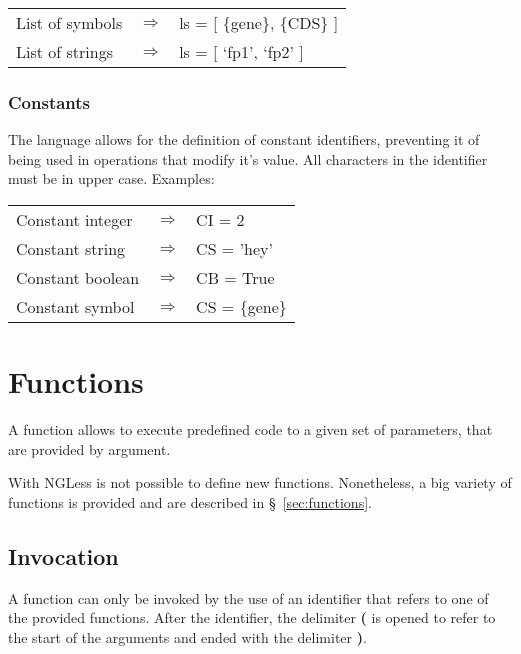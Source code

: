 \documentclass{article}
\begin{document}
\begin{table}[H]
\center
    \begin{tabular}{lll}
    List of symbols & $\Longrightarrow$ & ls = [ \{gene\}, \{CDS\} ] \\
    List of strings & $\Longrightarrow$ & ls = [ `fp1', `fp2' ] \\
    \end{tabular}
\end{table}


\subsubsection{Constants}

The language allows for the definition of constant identifiers, preventing it of being used in operations that modify it's value. All characters in the identifier must be in upper case. Examples:


\begin{table}[H]
\center
    \begin{tabular}{lll}
    Constant integer & $\Longrightarrow$ & CI = 2 \\
    Constant string  & $\Longrightarrow$ & CS = 'hey' \\
    Constant boolean & $\Longrightarrow$ & CB = True \\
    Constant symbol  & $\Longrightarrow$ & CS = \{gene\} \\
    \end{tabular}
\end{table}


\section{Functions}

A function allows to execute predefined code to a given set of parameters, that are provided by argument.

With NGLess is not possible to define new functions. Nonetheless, a big variety of functions is provided and are described in §~\ref{sec:functions}.

\subsection{Invocation}
\label{sec:invoke}
A function can only be invoked by the use of an identifier that refers to one of the provided functions. After the identifier, the delimiter \textbf{(} is opened to refer to the start of the arguments and ended with the delimiter \textbf{)}.
\end{document}
